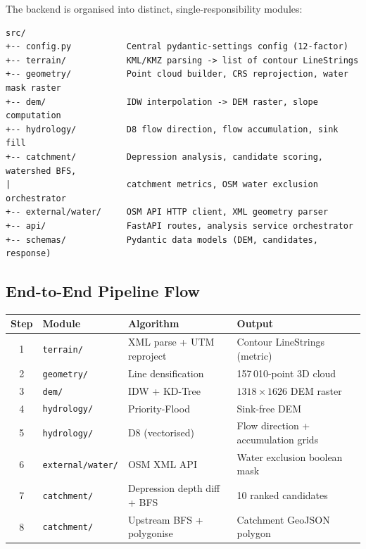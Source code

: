 \documentclass[12pt,a4paper]{article}
\begin{document}
The backend is organised into distinct, single-responsibility modules:

\begin{verbatim}
src/
+-- config.py           Central pydantic-settings config (12-factor)
+-- terrain/            KML/KMZ parsing -> list of contour LineStrings
+-- geometry/           Point cloud builder, CRS reprojection, water mask raster
+-- dem/                IDW interpolation -> DEM raster, slope computation
+-- hydrology/          D8 flow direction, flow accumulation, sink fill
+-- catchment/          Depression analysis, candidate scoring, watershed BFS,
|                       catchment metrics, OSM water exclusion orchestrator
+-- external/water/     OSM API HTTP client, XML geometry parser
+-- api/                FastAPI routes, analysis service orchestrator
+-- schemas/            Pydantic data models (DEM, candidates, response)
\end{verbatim}

\subsection{End-to-End Pipeline Flow}

\begin{center}
\begin{tabular}{clll}
    \toprule
    \textbf{Step} & \textbf{Module} & \textbf{Algorithm} & \textbf{Output} \\
    \midrule
    1 & \texttt{terrain/}       & XML parse + UTM reproject   & Contour LineStrings (metric) \\
    2 & \texttt{geometry/}      & Line densification          & 157\,010-point 3D cloud \\
    3 & \texttt{dem/}           & IDW + KD-Tree               & $1318\times1626$ DEM raster \\
    4 & \texttt{hydrology/}     & Priority-Flood              & Sink-free DEM \\
    5 & \texttt{hydrology/}     & D8 (vectorised)             & Flow direction + accumulation grids \\
    6 & \texttt{external/water/}& OSM XML API                 & Water exclusion boolean mask \\
    7 & \texttt{catchment/}     & Depression depth diff + BFS & 10 ranked candidates \\
    8 & \texttt{catchment/}     & Upstream BFS + polygonise   & Catchment GeoJSON polygon \\
    \bottomrule
\end{tabular}
\end{center}
\end{document}
